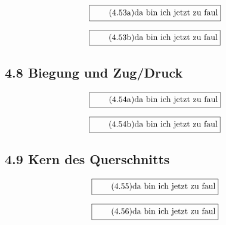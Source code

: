 \documentclass[11pt]{article}
\newcommand{\1}{ {\mathds{1}} }
\begin{document}
    \begin{equation}
      \boxed{
        \tag{4.53a}
        \begin{split}
          \text{da bin ich jetzt zu faul}
        \end{split}
      }
    \end{equation}

    \begin{equation}
      \boxed{
        \tag{4.53b}
        \begin{split}
          \text{da bin ich jetzt zu faul}
        \end{split}
      }
    \end{equation}

    \subsection*{4.8 Biegung und Zug/Druck}

    \begin{equation}
      \boxed{
        \tag{4.54a}
        \begin{split}
          \text{da bin ich jetzt zu faul}
        \end{split}
      }
    \end{equation}
    
    \begin{equation}
      \boxed{
        \tag{4.54b}
        \begin{split}
          \text{da bin ich jetzt zu faul}
        \end{split}
      }
    \end{equation}
    
    \subsection*{4.9 Kern des Querschnitts}

    \begin{equation}
      \boxed{
        \tag{4.55}
        \begin{split}
          \text{da bin ich jetzt zu faul}
        \end{split}
      }
    \end{equation}
    
    \begin{equation}
      \boxed{
        \tag{4.56}
        \begin{split}
          \text{da bin ich jetzt zu faul}
        \end{split}
      }
    \end{equation}
\end{document}
